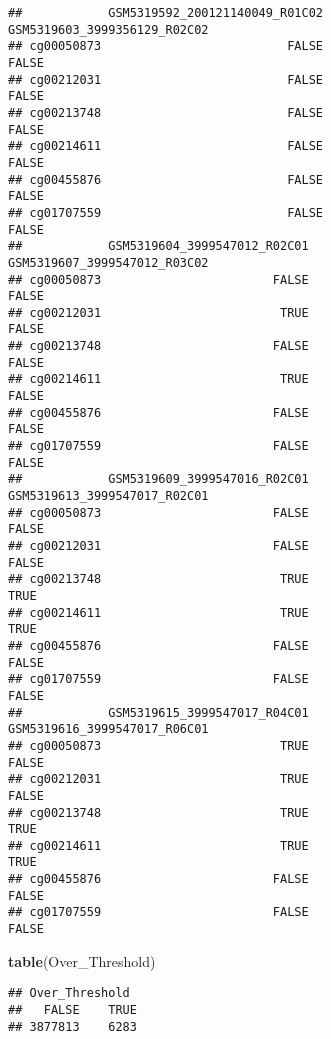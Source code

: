 \documentclass[
  11pt,
]{article}
\newenvironment{Shaded}{\begin{snugshade}}{\end{snugshade}}
\newcommand{\FunctionTok}[1]{\textcolor[rgb]{0.13,0.29,0.53}{\textbf{#1}}}
\newcommand{\NormalTok}[1]{#1}
\begin{document}
\begin{verbatim}
##            GSM5319592_200121140049_R01C02 GSM5319603_3999356129_R02C02
## cg00050873                          FALSE                        FALSE
## cg00212031                          FALSE                        FALSE
## cg00213748                          FALSE                        FALSE
## cg00214611                          FALSE                        FALSE
## cg00455876                          FALSE                        FALSE
## cg01707559                          FALSE                        FALSE
##            GSM5319604_3999547012_R02C01 GSM5319607_3999547012_R03C02
## cg00050873                        FALSE                        FALSE
## cg00212031                         TRUE                        FALSE
## cg00213748                        FALSE                        FALSE
## cg00214611                         TRUE                        FALSE
## cg00455876                        FALSE                        FALSE
## cg01707559                        FALSE                        FALSE
##            GSM5319609_3999547016_R02C01 GSM5319613_3999547017_R02C01
## cg00050873                        FALSE                        FALSE
## cg00212031                        FALSE                        FALSE
## cg00213748                         TRUE                         TRUE
## cg00214611                         TRUE                         TRUE
## cg00455876                        FALSE                        FALSE
## cg01707559                        FALSE                        FALSE
##            GSM5319615_3999547017_R04C01 GSM5319616_3999547017_R06C01
## cg00050873                         TRUE                        FALSE
## cg00212031                         TRUE                        FALSE
## cg00213748                         TRUE                         TRUE
## cg00214611                         TRUE                         TRUE
## cg00455876                        FALSE                        FALSE
## cg01707559                        FALSE                        FALSE
\end{verbatim}

\begin{Shaded}
\begin{Highlighting}[]
\FunctionTok{table}\NormalTok{(Over\_Threshold)}
\end{Highlighting}
\end{Shaded}

\begin{verbatim}
## Over_Threshold
##   FALSE    TRUE 
## 3877813    6283
\end{verbatim}
\end{document}
